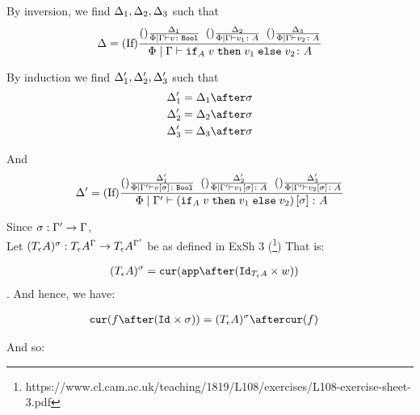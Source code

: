 \documentclass{report}
\begin{document}


By inversion, we find $\Delta_1, \Delta_2, \Delta_3$ such that
\begin{equation}
    \Delta = (\text{If}) \frac{(\text{}) \frac{\Delta_1}{\Phi\mid\Gamma \vdash v \colon \texttt{Bool}}\;\;(\text{}) \frac{\Delta_2}{\Phi\mid\Gamma \vdash v_1 \colon A}\;\;(\text{}) \frac{\Delta_3}{\Phi\mid\Gamma \vdash v_2 \colon A}}{\Phi\mid\Gamma \vdash \texttt{if}_{A}\; v\; \texttt{then}\; v_1 \;\texttt{else} \; v_2 \colon A}
\end{equation}

By induction we find $\Delta_1', \Delta_2', \Delta_3'$ such that 
\begin{align}
    \D_1' &= \D_1\after\si\\
    \D_2' &= \D_2\after\si\\
    \D_3' &= \D_3\after\si\\
\end{align}

And
\begin{equation}
    \Delta' = (\text{If}) \frac{(\text{}) \frac{\Delta_1'}{\Phi\mid\Gamma' \vdash v\left[\sigma\right] \colon \texttt{Bool}}\;\;(\text{}) \frac{\Delta_2'}{\Phi\mid\Gamma' \vdash v_1\left[\sigma\right] \colon A}\;\;(\text{}) \frac{\Delta_3'}{\Phi\mid\Gamma' \vdash v_2\left[\sigma\right] \colon A}}{\Phi\mid\Gamma' \vdash (\texttt{if}_{A}\; v\; \texttt{then}\; v_1 \;\texttt{else} \; v_2)\left[\sigma\right] \colon A}
\end{equation}

Since $\sigma: \Gamma' \rightarrow \Gamma$, \\
Let $(T_{\epsilon}{A})^{\sigma}: T_{\epsilon}{A}^{\Gamma}\rightarrow T_{\epsilon}{A}^{\Gamma'}$ be as defined in ExSh 3 (\footnote{https://www.cl.cam.ac.uk/teaching/1819/L108/exercises/L108-exercise-sheet-3.pdf})
That is:

\begin{align}
    (\tea)^{\si} & = \cur{\app\after(\Id{\tea}\times w)}
\end{align}.
And hence, we have:

\begin{align}
    \cur{f\after(\Id{}\times \si)} & = (\tea)^{\si} \after\cur{f}
\end{align}

And so:
\end{document}

